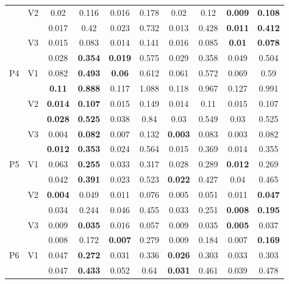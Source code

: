 \documentclass[12pt,a4paper]{article}
\begin{document}
\begin{sidewaystable}[ht]
{\begin{tabular}{cc|cc|cc|cc|cc|}
   & \multirow{2}{*}{V2} & 0.02 & 0.116 & 0.016 & 0.178 & 0.02 & 0.12 & \textbf{0.009} & \textbf{0.108} \\ 
   &  & 0.017 & 0.42 & 0.023 & 0.732 & 0.013 & 0.428 & \textbf{0.011} & \textbf{0.412} \\ 
   & \multirow{2}{*}{V3} & 0.015 & 0.083 & 0.014 & 0.141 & 0.016 & 0.085 & \textbf{0.01} & \textbf{0.078} \\ 
   &  & 0.028 & \textbf{0.354} & \textbf{0.019} & 0.575 & 0.029 & 0.358 & 0.049 & 0.504 \\ 
   \hline \hline\multirow{6}{*}{P4} & \multirow{2}{*}{V1} & 0.082 & \textbf{0.493} & \textbf{0.06} & 0.612 & 0.061 & 0.572 & 0.069 & 0.59 \\ 
   &  & \textbf{0.11} & \textbf{0.888} & 0.117 & 1.088 & 0.118 & 0.967 & 0.127 & 0.991 \\ 
   & \multirow{2}{*}{V2} & \textbf{0.014} & \textbf{0.107} & 0.015 & 0.149 & 0.014 & 0.11 & 0.015 & 0.107 \\ 
   &  & \textbf{0.028} & \textbf{0.525} & 0.038 & 0.84 & 0.03 & 0.549 & 0.03 & 0.525 \\ 
   & \multirow{2}{*}{V3} & 0.004 & \textbf{0.082} & 0.007 & 0.132 & \textbf{0.003} & 0.083 & 0.003 & 0.082 \\ 
   &  & \textbf{0.012} & \textbf{0.353} & 0.024 & 0.564 & 0.015 & 0.369 & 0.014 & 0.355 \\ 
   \hline \hline\multirow{6}{*}{P5} & \multirow{2}{*}{V1} & 0.063 & \textbf{0.255} & 0.033 & 0.317 & 0.028 & 0.289 & \textbf{0.012} & 0.269 \\ 
   &  & 0.042 & \textbf{0.391} & 0.023 & 0.523 & \textbf{0.022} & 0.427 & 0.04 & 0.465 \\ 
   & \multirow{2}{*}{V2} & \textbf{0.004} & 0.049 & 0.011 & 0.076 & 0.005 & 0.051 & 0.011 & \textbf{0.047} \\ 
   &  & 0.034 & 0.244 & 0.046 & 0.455 & 0.033 & 0.251 & \textbf{0.008} & \textbf{0.195} \\ 
   & \multirow{2}{*}{V3} & 0.009 & \textbf{0.035} & 0.016 & 0.057 & 0.009 & 0.035 & \textbf{0.005} & 0.037 \\ 
   &  & 0.008 & 0.172 & \textbf{0.007} & 0.279 & 0.009 & 0.184 & 0.007 & \textbf{0.169} \\ 
   \hline \hline\multirow{6}{*}{P6} & \multirow{2}{*}{V1} & 0.047 & \textbf{0.272} & 0.031 & 0.336 & \textbf{0.026} & 0.303 & 0.033 & 0.303 \\ 
   &  & 0.047 & \textbf{0.433} & 0.052 & 0.64 & \textbf{0.031} & 0.461 & 0.039 & 0.478 \\ 

\end{tabular}}
\end{sidewaystable}
\end{document}
